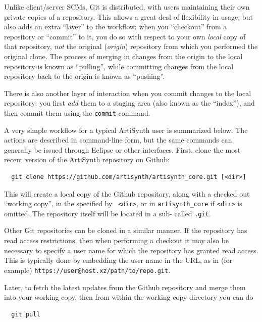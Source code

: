 Unlike client/server SCMs, Git is distributed, with users maintaining
their own private copies of a repository. This allows a great deal of
flexibility in usage, but also adds an extra ``layer'' to the
workflow: when you ``checkout'' from a repository or ``commit'' to it,
you do so with respect to your own {\it local} copy of that
repository, {\it not} the original ({\it origin}) repository from
which you performed the original clone. The process of merging in
changes from the origin to the local repository is known as
``pulling'', while committing changes from the local repository back
to the origin is known as ``pushing''.

There is also another layer of interaction when you commit changes to
the local repository: you first {\it add} them to a staging area
(also known as the ``index''), and then commit them using the {\tt commit}
command.

A very simple workflow for a typical ArtiSynth user is summarized
below. The actions are described in command-line form, but the same
commands can generally be issued through Eclipse or other
interfaces. First, clone the most recent version of the ArtiSynth
repository on Github:

\begin{verbatim}
  git clone https://github.com/artisynth/artisynth_core.git [<dir>]
\end{verbatim}

This will create a local copy of the Github repository, along with a
checked out ``working copy'', in the \directory{} specified by {\tt
<dir>}, or in {\tt artisynth\_core} if {\tt <dir>} is
omitted.  The repository itself will be located in a sub-\directory{}
called {\tt .git}.

Other Git repositories can be cloned in a similar manner.  If the
repository has read access restrictions, then when performing a checkout it
may also be necessary to specify a user name for which the repository
has granted read access. This is typically done by embedding the user
name in the URL, as in (for example)
{\tt https://user@host.xz/path/to/repo.git}.

Later, to fetch the latest updates from the Github repository and
merge them into your working copy, then from within the working copy
directory you can do
\begin{verbatim}
  git pull
\end{verbatim}

